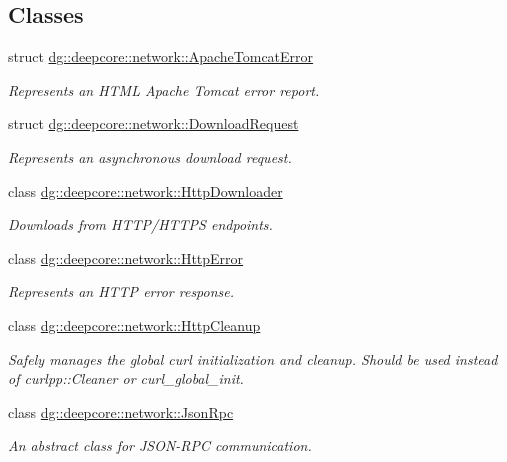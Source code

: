 \subsection*{Classes}
\begin{DoxyCompactItemize}
\item 
struct \hyperlink{structdg_1_1deepcore_1_1network_1_1_apache_tomcat_error}{dg\+::deepcore\+::network\+::\+Apache\+Tomcat\+Error}
\begin{DoxyCompactList}\small\item\em Represents an H\+T\+ML Apache Tomcat error report. \end{DoxyCompactList}\item 
struct \hyperlink{structdg_1_1deepcore_1_1network_1_1_download_request}{dg\+::deepcore\+::network\+::\+Download\+Request}
\begin{DoxyCompactList}\small\item\em Represents an asynchronous download request. \end{DoxyCompactList}\item 
class \hyperlink{classdg_1_1deepcore_1_1network_1_1_http_downloader}{dg\+::deepcore\+::network\+::\+Http\+Downloader}
\begin{DoxyCompactList}\small\item\em Downloads from H\+T\+T\+P/\+H\+T\+T\+PS endpoints. \end{DoxyCompactList}\item 
class \hyperlink{classdg_1_1deepcore_1_1network_1_1_http_error}{dg\+::deepcore\+::network\+::\+Http\+Error}
\begin{DoxyCompactList}\small\item\em Represents an H\+T\+TP error response. \end{DoxyCompactList}\item 
class \hyperlink{classdg_1_1deepcore_1_1network_1_1_http_cleanup}{dg\+::deepcore\+::network\+::\+Http\+Cleanup}
\begin{DoxyCompactList}\small\item\em Safely manages the global curl initialization and cleanup. Should be used instead of curlpp\+::\+Cleaner or curl\+\_\+global\+\_\+init. \end{DoxyCompactList}\item 
class \hyperlink{classdg_1_1deepcore_1_1network_1_1_json_rpc}{dg\+::deepcore\+::network\+::\+Json\+Rpc}
\begin{DoxyCompactList}\small\item\em An abstract class for J\+S\+O\+N-\/\+R\+PC communication. \end{DoxyCompactList}\item 

\end{DoxyCompactItemize}
